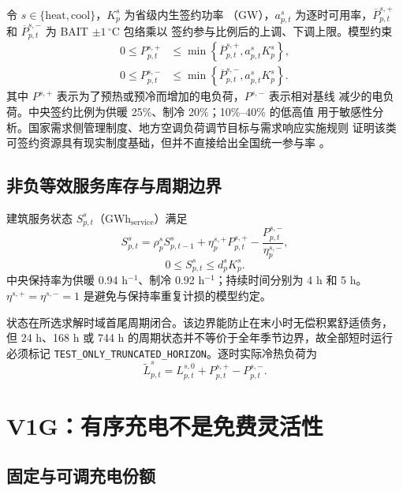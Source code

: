 \documentclass[UTF8,fontset=fandol,12pt]{ctexart}
\newcommand{\status}[1]{\nolinkurl{#1}}
\begin{document}
令 $s\in\{\mathrm{heat},\mathrm{cool}\}$，$K^{s}_p$ 为省级内生签约功率
（GW），$a^s_{p,t}$ 为逐时可用率，$\overline P^{s,+}_{p,t}$ 和
$\overline P^{s,-}_{p,t}$ 为 BAIT $\pm1\,^{\circ}\mathrm{C}$ 包络乘以
签约参与比例后的上调、下调上限。模型约束
\begin{align}
  0\le P^{s,+}_{p,t}
  &\le
  \min\!\left\{\overline P^{s,+}_{p,t},
  a^s_{p,t}K^s_p\right\},\\
  0\le P^{s,-}_{p,t}
  &\le
  \min\!\left\{\overline P^{s,-}_{p,t},
  a^s_{p,t}K^s_p\right\}.
\end{align}
其中 $P^{s,+}$ 表示为了预热或预冷而增加的电负荷，$P^{s,-}$ 表示相对基线
减少的电负荷。中央签约比例为供暖 25\%、制冷 20\%；10\%--40\% 的低高值
用于敏感性分析。国家需求侧管理制度、地方空调负荷调节目标与需求响应实施规则
证明该类可签约资源具有现实制度基础，但并不直接给出全国统一参与率
\cite{NDRCDemand2023,ShanghaiHVAC2025,AnhuiDR2025,ZhejiangHVAC2025}。

\subsection{非负等效服务库存与周期边界}

建筑服务状态 $S^s_{p,t}$（GWh$_\mathrm{service}$）满足
\begin{equation}
  S^s_{p,t}
  =
  \rho^s_p S^s_{p,t-1}
  +\eta^{s,+}_p P^{s,+}_{p,t}
  -\frac{P^{s,-}_{p,t}}{\eta^{s,-}_p},
  \label{eq:thermalstate}
\end{equation}
\begin{equation}
  0\le S^s_{p,t}\le d^s_p K^s_p.
\end{equation}
中央保持率为供暖 0.94 h$^{-1}$、制冷 0.92 h$^{-1}$；持续时间分别为
4 h 和 5 h。$\eta^{s,+}=\eta^{s,-}=1$ 是避免与保持率重复计损的模型约定。

状态在所选求解时域首尾周期闭合。该边界能防止在末小时无偿积累舒适债务，
但 24 h、168 h 或 744 h 的周期状态并不等价于全年季节边界，故全部短时运行
必须标记 \status{TEST_ONLY_TRUNCATED_HORIZON}。逐时实际冷热负荷为
\begin{equation}
  \widetilde L^s_{p,t}
  =
  L^{s,0}_{p,t}+P^{s,+}_{p,t}-P^{s,-}_{p,t}.
\end{equation}

\section{V1G：有序充电不是免费灵活性}

\subsection{固定与可调充电份额}
\end{document}
